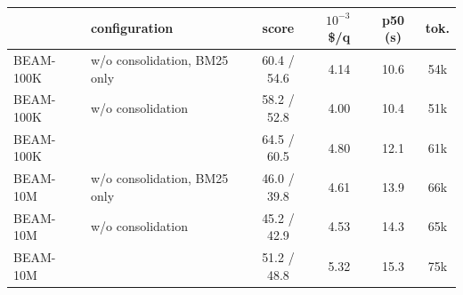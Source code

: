 \begin{gentable}
\centering
\small
\caption{\textbf{From a hundred thousand to ten million tokens.} BEAM-100K (20 conversations, 400 questions) and BEAM-10M (10 conversations of about 90,000 records each, 200 questions): rubric score under the gpt-4.1-mini / DeepSeek judges, cost per question (answer, planner and \jev, thousandths of a dollar at the reader's list prices), median latency, and median \jev{} input tokens per question. gpt-4.1-mini answers and plans in every row. Scores cover every question each run answered; \cref{tab:consolidation} pairs the questions both judges graded in both runs.}
\label{tab:beam10m}
\setlength{\tabcolsep}{4pt}
\begin{tabular}{@{}l l c c c c@{}}
\toprule
& configuration & score & $10^{-3}$\,\$/q & p50 (s) & \jev{} tok. \\
\midrule
BEAM-100K & w/o consolidation, BM25 only & 60.4 / 54.6 & 4.14 & 10.6 & 54k \\
BEAM-100K & w/o consolidation & 58.2 / 52.8 & 4.00 & 10.4 & 51k \\
BEAM-100K & \sys{} & 64.5 / 60.5 & 4.80 & 12.1 & 61k \\
\midrule
BEAM-10M & w/o consolidation, BM25 only & 46.0 / 39.8 & 4.61 & 13.9 & 66k \\
BEAM-10M & w/o consolidation & 45.2 / 42.9 & 4.53 & 14.3 & 65k \\
BEAM-10M & \sys{} & 51.2 / 48.8 & 5.32 & 15.3 & 75k \\
\bottomrule
\end{tabular}
\end{gentable}

